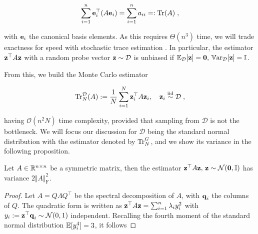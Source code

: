 \documentclass{article}
\begin{document}
{\begin{equation*}
    \sum_{i=1}^n \boldsymbol{\mathbf{e}}_i^\top (A \boldsymbol{\mathbf{e}}_i) = \sum_{i=1}^n a_{ii} =: \operatorname{Tr}(A) \; ,
\end{equation*}

with $\boldsymbol{\mathbf{e}}_i$ the canonical basis elements. As this requires $\Theta(n^3)$ time, we will trade exactness for speed with stochastic trace estimation \cite{cortinovis_randomized_2021, ubaru_fast_2017}. 
In particular, the estimator $\boldsymbol{\mathbf{z}}^\top A \boldsymbol{\mathbf{z}}$ with a random probe vector $\boldsymbol{\mathbf{z}} \sim \mathcal D$ is unbiased if $\E_\mathcal{D}[\vect z] = \vect 0, \, \Var_\mathcal{D}[\vect z] = \Id$.

%
From this, we build the Monte Carlo estimator 

\begin{equation*}
    \operatorname{Tr}_N^{\mathcal D}(A) := \frac{1}{N} \sum_{i=1}^N \boldsymbol{\mathbf{z}}_i^\top A \boldsymbol{\mathbf{z}}_i, \quad \boldsymbol{\mathbf{z}}_i \stackrel{\text{iid}}{\sim} \mathcal D \;,
\end{equation*}

having $\mathcal O(n^2N)$ time complexity, provided that sampling from $\mathcal D$ is not the bottleneck. We will focus our discussion for $\mathcal D$ being the standard normal distribution with the estimator denoted by $\operatorname{Tr}_N^G$, and we show its variance in the following proposition.


\begin{proposition} \label{prop:trace_estim_variance}
Let $A \in \mathbb R^{n \times n}$ be a symmetric matrix, then the estimator $\vect z^\top A \vect z, \, \vect z\sim \mathcal N(\vect 0, \Id)$ has variance $2 \Vert A \Vert_\text{F}^2$.
\end{proposition}
\begin{proof} 
Let $A = Q \Lambda Q^\top$ be the spectral decomposition of $A$, with $\boldsymbol{\mathbf{q}}_i$ the columns of $Q$. The quadratic form is written as $\boldsymbol{\mathbf{z}}^\top A \boldsymbol{\mathbf{z}} = \sum_{i=1}^n \lambda_i y_i^2$ with $y_i := \boldsymbol{\mathbf{z}}^\top \boldsymbol{\mathbf{q}}_i \sim \mathcal N(0, 1)$ independent. Recalling the fourth moment of the standard normal distribution $\operatorname{\mathbb{E}}[y_i^4] = 3$, it follows


\end{proof}}
\end{document}
